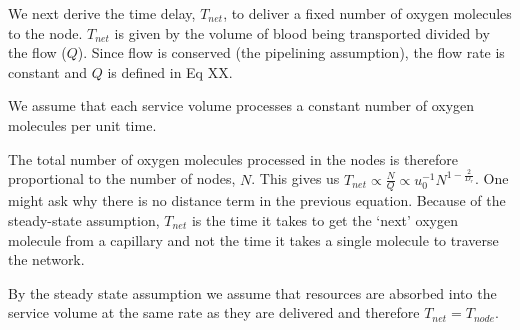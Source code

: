 \documentclass[12pt]{article}
\begin{document}


We next derive the time delay, $T_{net}$, to deliver a fixed number of oxygen molecules to the
node.  $T_{net}$ is given by the volume of blood being transported divided
by the flow ($Q$). Since flow is conserved (the pipelining assumption), the
flow rate is constant and $Q$ is defined in Eq XX. 


We assume that each service volume processes a constant number of oxygen molecules per unit time.

The total number of oxygen molecules processed in the nodes is therefore proportional to the number of nodes, $N$. This gives us $T_{net}\propto \frac{N}{Q} \propto
u_0^{-1}N^{1-\frac{2}{D_r}}$.  One might ask why there is no distance term
in the previous equation.  Because of the steady-state assumption, $T_{net}$ is
the time it takes to get the `next' oxygen molecule from a capillary and not
the time it takes a single molecule to traverse the network.

By the steady state assumption we assume that resources are absorbed into the
service volume at the same rate as they are delivered and therefore
$T_{net}=T_{node}$.

\end{document}
